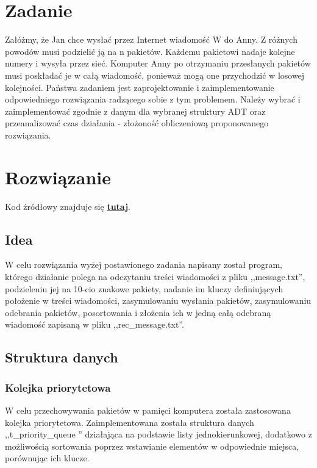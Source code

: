\documentclass[12pt]{article}
\begin{document}
    


\section{Zadanie}\label{ch:1}


Załóżmy, że Jan chce wysłać przez Internet wiadomość W do Anny. Z różnych powodów musi podzielić
ją na n pakietów. Każdemu pakietowi nadaje kolejne numery i wysyła przez sieć. Komputer Anny po otrzymaniu
przesłanych pakietów musi poskładać je w całą wiadomość, ponieważ mogą one przychodzić w losowej
kolejności. Państwa zadaniem jest zaprojektowanie i zaimplementowanie odpowiedniego rozwiązania radzącego
sobie z tym problemem. Należy wybrać i zaimplementować zgodnie z danym dla wybranej struktury
ADT oraz przeanalizować czas działania - złożoność obliczeniową proponowanego rozwiązania.

\section{Rozwiązanie}\label{ch:2}

Kod źródłowy znajduje się  \href{https://github.com/PartyKusZ/PAMSI}{\textbf{tutaj}}.

\subsection{Idea}

W celu rozwiązania wyżej postawionego zadania napisany został program, którego działanie polega na odczytaniu treści wiadomości z pliku ,,message.txt'',
podzieleniu jej na 10-cio znakowe pakiety, nadanie im kluczy definiujących położenie w treści wiadomości, zasymulowaniu wysłania pakietów, zasymulowaniu 
odebrania pakietów, posortowania i złożenia ich w jedną całą odebraną wiadomość zapisaną w pliku ,,rec\_message.txt''.

\subsection{Struktura danych}

\subsubsection{Kolejka priorytetowa}

W celu przechowywania pakietów w pamięci komputera została zastosowana kolejka priorytetowa. Zaimplementowana została struktura danych ,,t\_priority\_queue '' działająca na podstawie listy jednokierunkowej, dodatkowo z możliwością sortowania 
poprzez wstawianie elementów w odpowiednie miejsca, porównując ich klucze.
\end{document}
